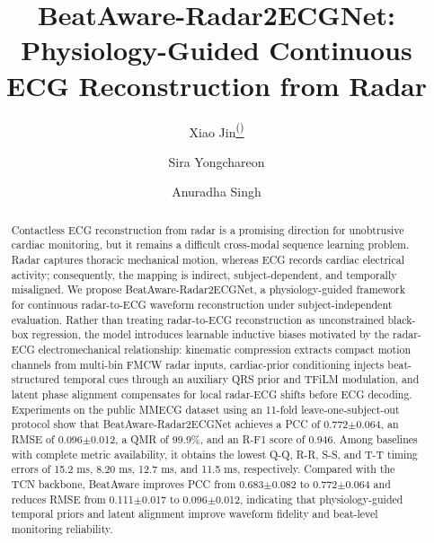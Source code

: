 \documentclass[runningheads]{llncs}
\begin{document}
\title{BeatAware-Radar2ECGNet: Physiology-Guided Continuous ECG Reconstruction from Radar}

\author{Xiao Jin\href{mailto:xiao.jin@autuni.ac.nz}{\textsuperscript{(\Letter)}} \and
Sira Yongchareon \and
Anuradha Singh}



\maketitle

\begin{abstract}
Contactless ECG reconstruction from radar is a promising direction for unobtrusive cardiac monitoring, but it remains a difficult cross-modal sequence learning problem. Radar captures thoracic mechanical motion, whereas ECG records cardiac electrical activity; consequently, the mapping is indirect, subject-dependent, and temporally misaligned. We propose BeatAware-Radar2ECGNet, a physiology-guided framework for continuous radar-to-ECG waveform reconstruction under subject-independent evaluation. Rather than treating radar-to-ECG reconstruction as unconstrained black-box regression, the model introduces learnable inductive biases motivated by the radar-ECG electromechanical relationship: kinematic compression extracts compact motion channels from multi-bin FMCW radar inputs, cardiac-prior conditioning injects beat-structured temporal cues through an auxiliary QRS prior and TFiLM modulation, and latent phase alignment compensates for local radar-ECG shifts before ECG decoding. Experiments on the public MMECG dataset using an 11-fold leave-one-subject-out protocol show that BeatAware-Radar2ECGNet achieves a PCC of 0.772$\pm$0.064, an RMSE of 0.096$\pm$0.012, a QMR of 99.9\%, and an R-F1 score of 0.946. Among baselines with complete metric availability, it obtains the lowest Q-Q, R-R, S-S, and T-T timing errors of 15.2 ms, 8.20 ms, 12.7 ms, and 11.5 ms, respectively. Compared with the TCN backbone, BeatAware improves PCC from 0.683$\pm$0.082 to 0.772$\pm$0.064 and reduces RMSE from 0.111$\pm$0.017 to 0.096$\pm$0.012, indicating that physiology-guided temporal priors and latent alignment improve waveform fidelity and beat-level monitoring reliability.

\end{abstract}
\end{document}
